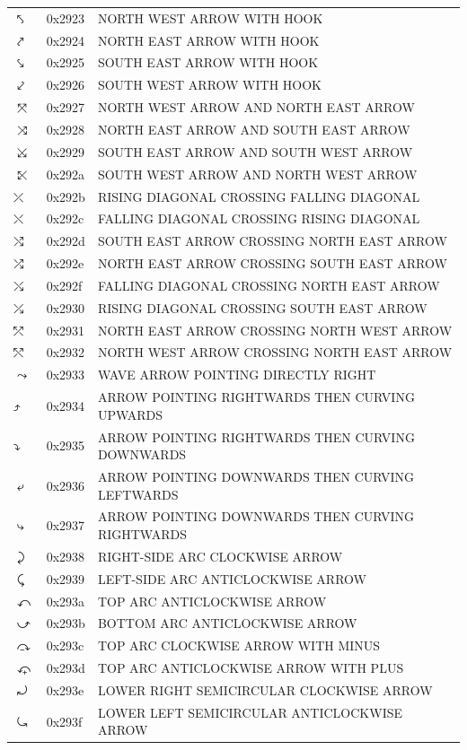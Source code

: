 \documentclass[12pt, twoside]{article}
\begin{document}
\begin{longtable}{L{1.0cm} L{2.0cm} >{\footnotesize}L{10cm}}
$⤣$&0x2923&NORTH WEST ARROW WITH HOOK\\
$⤤$&0x2924&NORTH EAST ARROW WITH HOOK\\
$⤥$&0x2925&SOUTH EAST ARROW WITH HOOK\\
$⤦$&0x2926&SOUTH WEST ARROW WITH HOOK\\
$⤧$&0x2927&NORTH WEST ARROW AND NORTH EAST ARROW\\
$⤨$&0x2928&NORTH EAST ARROW AND SOUTH EAST ARROW\\
$⤩$&0x2929&SOUTH EAST ARROW AND SOUTH WEST ARROW\\
$⤪$&0x292a&SOUTH WEST ARROW AND NORTH WEST ARROW\\
$⤫$&0x292b&RISING DIAGONAL CROSSING FALLING DIAGONAL\\
$⤬$&0x292c&FALLING DIAGONAL CROSSING RISING DIAGONAL\\
$⤭$&0x292d&SOUTH EAST ARROW CROSSING NORTH EAST ARROW\\
$⤮$&0x292e&NORTH EAST ARROW CROSSING SOUTH EAST ARROW\\
$⤯$&0x292f&FALLING DIAGONAL CROSSING NORTH EAST ARROW\\
$⤰$&0x2930&RISING DIAGONAL CROSSING SOUTH EAST ARROW\\
$⤱$&0x2931&NORTH EAST ARROW CROSSING NORTH WEST ARROW\\
$⤲$&0x2932&NORTH WEST ARROW CROSSING NORTH EAST ARROW\\
$⤳$&0x2933&WAVE ARROW POINTING DIRECTLY RIGHT\\
$⤴$&0x2934&ARROW POINTING RIGHTWARDS THEN CURVING UPWARDS\\
$⤵$&0x2935&ARROW POINTING RIGHTWARDS THEN CURVING DOWNWARDS\\
$⤶$&0x2936&ARROW POINTING DOWNWARDS THEN CURVING LEFTWARDS\\
$⤷$&0x2937&ARROW POINTING DOWNWARDS THEN CURVING RIGHTWARDS\\
$⤸$&0x2938&RIGHT-SIDE ARC CLOCKWISE ARROW\\
$⤹$&0x2939&LEFT-SIDE ARC ANTICLOCKWISE ARROW\\
$⤺$&0x293a&TOP ARC ANTICLOCKWISE ARROW\\
$⤻$&0x293b&BOTTOM ARC ANTICLOCKWISE ARROW\\
$⤼$&0x293c&TOP ARC CLOCKWISE ARROW WITH MINUS\\
$⤽$&0x293d&TOP ARC ANTICLOCKWISE ARROW WITH PLUS\\
$⤾$&0x293e&LOWER RIGHT SEMICIRCULAR CLOCKWISE ARROW\\
$⤿$&0x293f&LOWER LEFT SEMICIRCULAR ANTICLOCKWISE ARROW\\

\end{longtable}
\end{document}
